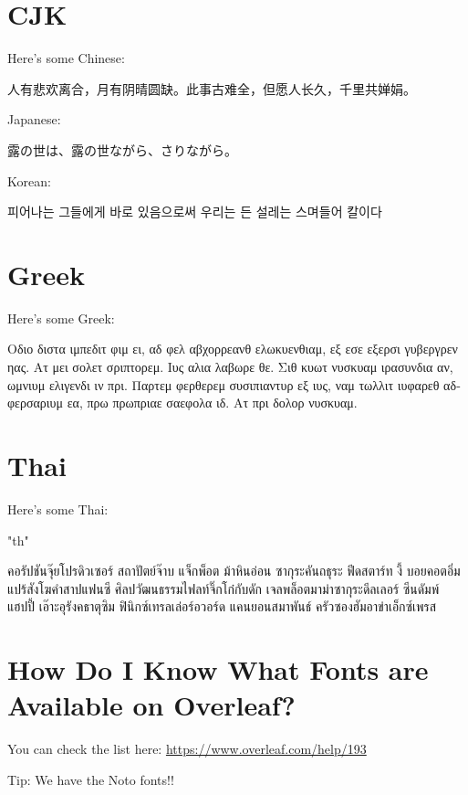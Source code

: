 \documentclass[12pt]{scrartcl}
\begin{document}
\section{CJK}
Here's some Chinese:

人有悲欢离合，月有阴晴圆缺。此事古难全，但愿人长久，千里共婵娟。


Japanese:

{\japanesefont 露の世は、露の世ながら、さりながら。}


Korean:

{\koreanfont 피어나는 그들에게 바로 있음으로써 우리는 든 설레는 스며들어 칼이다}


\section{Greek}
Here's some Greek:

\begin{greek}
Οδιο διστα ιμπεδιτ φιμ ει, αδ φελ αβχορρεανθ ελωκυενθιαμ, εξ εσε εξερσι γυβεργρεν ηας. Ατ μει σολετ σριπτορεμ. Ιυς αλια λαβωρε θε. Σιθ κυωτ νυσκυαμ ιρασυνδια αν, ωμνιυμ ελιγενδι ιν πρι. Παρτεμ φερθερεμ συσιπιαντυρ εξ ιυς, ναμ τωλλιτ ιυφαρεθ αδφερσαριυμ εα, πρω πρωπριαε σαεφολα ιδ. Ατ πρι δολορ νυσκυαμ.
\end{greek}



\section{Thai}
Here's some Thai:

\begin{thai}
\XeTeXlinebreaklocale "th"
\raggedright
คอรัปชันจุ๊ยโปรดิวเซอร์ สถาปัตย์จ๊าบ แจ็กพ็อต ม้าหินอ่อน ซากุระคันถธุระ ฟีดสตาร์ท งี้ บอยคอตอิ่มแปร้สังโฆคำสาปแฟนซี ศิลปวัฒนธรรมไฟลท์จิ๊กโก๋กับดัก เจลพล็อตมาม่าซากุระดีลเลอร์ ซีนดัมพ์ แฮปปี้ เอ๊าะอุรังคธาตุซิม ฟินิกซ์เทรลเล่อร์อวอร์ด แคนยอนสมาพันธ์ ครัวซองฮัมอาข่าเอ็กซ์เพรส 
\end{thai}


\section{How Do I Know What Fonts are Available on Overleaf?}

You can check the list here: \url{https://www.overleaf.com/help/193}

Tip: We have the Noto fonts!!
\end{document}

